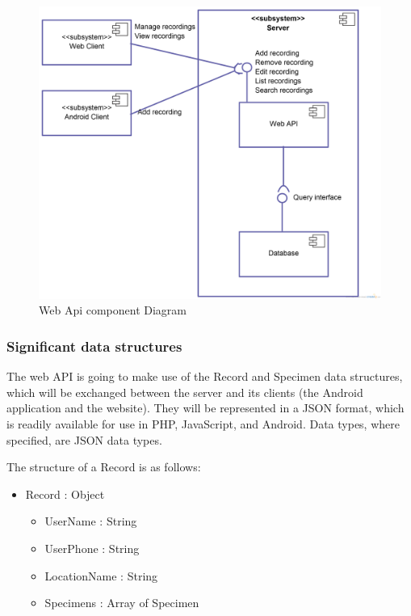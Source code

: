         \begin{landscape}
            \begin{figure}
                \centering
                \includegraphics[scale=0.2]{server/ComponentDiagram.png}
                \caption{Web Api component Diagram}
                \label{fig:webAPIComponentDiagram}
            \end{figure}
        \end{landscape}

    \subsubsection{Significant data structures}

        The web API is going to make use of the Record and Specimen data structures, which will be exchanged between the server and its clients (the Android application and the website). They will be represented in a JSON format, which is readily available for use in PHP, JavaScript, and Android. Data types, where specified, are JSON data types. 

        The structure of a Record is as follows:
        \begin{itemize}
            \item Record : Object
            \begin{itemize}
                \item UserName : String
                \item UserPhone : String
                \item LocationName : String 
                \item Specimens : Array of Specimen
            \end{itemize}
        \end{itemize}


